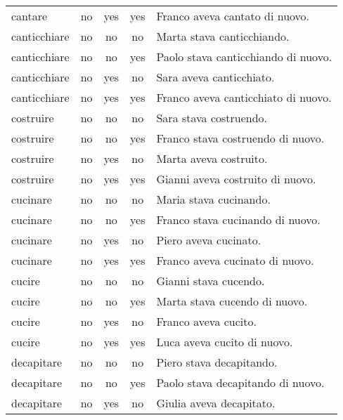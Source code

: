 \begin{longtable}{l|ccc|p{5cm}}
cantare        & no   & yes        & yes       & Franco aveva cantato di nuovo.        \\
canticchiare   & no   & no         & no        & Marta stava canticchiando.            \\
canticchiare   & no   & no         & yes       & Paolo stava canticchiando di nuovo.   \\
canticchiare   & no   & yes        & no        & Sara aveva canticchiato.              \\
canticchiare   & no   & yes        & yes       & Franco aveva canticchiato di nuovo.   \\
costruire      & no   & no         & no        & Sara stava costruendo.                \\
costruire      & no   & no         & yes       & Franco stava costruendo di nuovo.     \\
costruire      & no   & yes        & no        & Marta aveva costruito.                \\
costruire      & no   & yes        & yes       & Gianni aveva costruito di nuovo.      \\
cucinare       & no   & no         & no        & Maria stava cucinando.                \\
cucinare       & no   & no         & yes       & Franco stava cucinando di nuovo.      \\
cucinare       & no   & yes        & no        & Piero aveva cucinato.                 \\
cucinare       & no   & yes        & yes       & Franco aveva cucinato di nuovo.       \\
cucire         & no   & no         & no        & Gianni stava cucendo.                 \\
cucire         & no   & no         & yes       & Marta stava cucendo di nuovo.         \\
cucire         & no   & yes        & no        & Franco aveva cucito.                  \\
cucire         & no   & yes        & yes       & Luca aveva cucito di nuovo.           \\
decapitare     & no   & no         & no        & Piero stava decapitando.              \\
decapitare     & no   & no         & yes       & Paolo stava decapitando di nuovo.     \\
decapitare     & no   & yes        & no        & Giulia aveva decapitato.              \\

\end{longtable}
